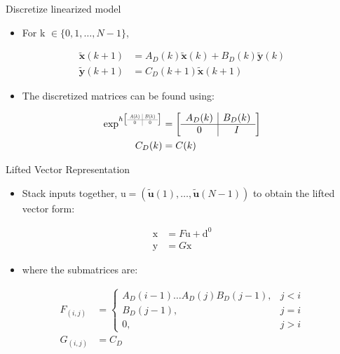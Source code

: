 \documentclass{beamer}
\newcommand{\state}{\mathbf{x}} %
\newcommand{\sysInput}{\mathbf{u}} %
\newcommand{\observations}{\mathbf{y}} %
\newcommand{\liftedinput}{\mathrm{u}}
\newcommand{\liftedstate}{\mathrm{x}}
\newcommand{\liftedobs}{\mathrm{y}}
\newcommand{\disturbance}{\mathrm{d}}
\newcommand\scalemath[2]{\scalebox{#1}{\mbox{\ensuremath{\displaystyle #2}}}} %
\begin{document}
\begin{frame}{Discretize linearized model}
\begin{itemize}
\item For k $\in \{ 0, 1, \ldots, N-1 \}$, \pause
\end{itemize}
\begin{equation*}
\begin{aligned}
\tilde{\state}(k+1) &= A_{D}(k)\tilde{\state}(k) + B_{D}(k)\tilde{\observations}(k) \\
\tilde{\observations}(k+1) &= C_{D}(k+1)\tilde{\state}(k+1)
\end{aligned}
\end{equation*}
\pause
\begin{itemize}
\item The discretized matrices can be found using: \pause
\linebreak
\end{itemize}
\begin{equation*}
\begin{aligned}
\exp^{h
\left[
\scalemath{0.5}{
\begin{array}{c|c}
A(k) & B(k) \\ \hline
0 & 0
\end{array}}\right]}
&= 
\left[
\begin{array}{c|c}
A_{D}(k) & B_{D}(k) \\ \hline
0 & I
\end{array}\right] \\
C_{D}(k) &= C(k)
\end{aligned}
\end{equation*}
\end{frame}
%
\begin{frame}{Lifted Vector Representation}
\begin{itemize}
\item Stack inputs together, $\liftedinput = (\tilde{\sysInput}(1), \ldots, \tilde{\sysInput}(N-1))$ to obtain the lifted vector form: \pause
\end{itemize}
\begin{equation*}
\begin{aligned}
\liftedstate &= F\liftedinput + \disturbance^{0} \\
\liftedobs &= G\liftedstate  
\end{aligned}
\end{equation*}
\pause
\begin{itemize}
\item where the submatrices are: \pause
\linebreak
\end{itemize}
\begin{equation*}
\begin{aligned}
F_{(i,j)} &= \left \{
\begin{array}{cc}
A_{D}(i-1)\ldots A_{D}(j)B_{D}(j-1), & j < i \\ 
B_{D}(j-1), & j = i \\
0, & j > i 
\end{array} \right. \\
G_{(i,j)} &= C_{D}
\end{aligned}
\end{equation*}
\end{frame}
\end{document}
